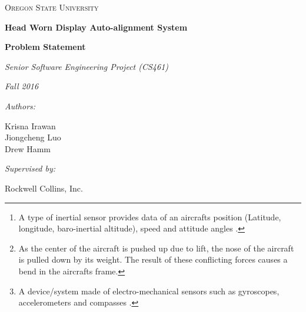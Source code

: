 \documentclass[letterpaper,10pt,notitlepage]{article}
\def\name{Krisna Irawan\\ Jiongcheng Luo\\ Drew Hamm}
\begin{document}
\begin{titlepage}
	\centering
	{\scshape\LARGE Oregon State University\par}
	\vspace{2cm}
	{\huge\bfseries Head Worn Display Auto-alignment System\par}
	\vspace{1cm}
	{\Large\bfseries Problem Statement\par}
	\vspace{1cm}
	{\Large\itshape Senior Software Engineering Project (CS461)\par}
	{\Large\itshape Fall 2016\par}
	\vspace{1cm}
	{\normalsize\itshape Authors:\par}
	{\normalsize \name\par}
	\vspace{1cm}
	{\normalsize\itshape Supervised by:\par}
	{\normalsize Rockwell Collins, Inc.\par}
	\vspace{3cm}

	\begin{abstract}
	A Head-up Display (HUD), is a transparent display that presents all necessary data that pilots need in their flight environment. Currently, the HUD obtains data from an aircraft\textquotesingle s mounted device called inertial reference unit (IRU)\footnote{A type of inertial sensor provides data of an aircraft\textquotesingle s position (Latitude, longitude, baro-inertial altitude), speed and attitude angles \cite{iru}.}, this IRU outputs precise and aligned data to the HUD. However, the current alignment process requires specialized equipment and epoxy which is time consuming, costly, and interrupts production line progress for the original equipment manufacturer. In addition, the resulting HUD alignment, while precise, does not compensate for airframe droop\footnote{As the center of the aircraft is pushed up due to lift, the nose of the aircraft is pulled down by its weight. The result of these conflicting forces causes a bend in the aircraft\textquotesingle s frame. } during flight. Rockwell Collins looks forward to a new alignment methodology utilizing an inexpensive microelectromechanical systems (MEMS)\footnote{A device/system made of electro-mechanical sensors such as gyroscopes, accelerometers and compasses \cite{mems}.} IRU mounted onto the HUD to infer alignment data from the aircraft\textquotesingle s precisely mounted and aligned IRU. This project works on a solution that utilizes the data from both the inexpensive MEMS IRU and the aircraft mounted IRU to develop an algorithm, which aims to output precise and aligned data with reduced installation cost.
\end{abstract}
\end{titlepage}
\end{document}

